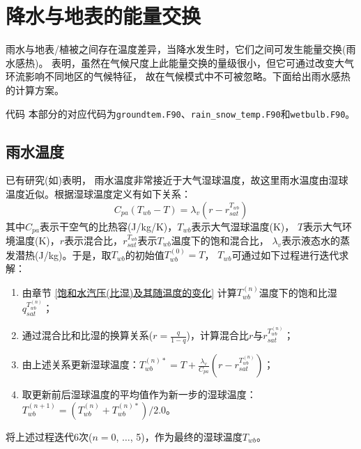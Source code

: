 \chapter{降水与地表的能量交换}

雨水与地表/植被之间存在温度差异，当降水发生时，它们之间可发生能量交换(雨水感热)。
\citet{wei2014impact} 表明，虽然在气候尺度上此能量交换的量级很小，但它可通过改变大气环流影响不同地区的气候特征，
故在气候模式中不可被忽略。下面给出雨水感热的计算方案。
\begin{mymdframed}{代码}
本部分的对应代码为\texttt{groundtem.F90}、\texttt{rain\_snow\_temp.F90}和\texttt{wetbulb.F90}。
\end{mymdframed}


\section{雨水温度}\label{雨水温度}
已有研究(如\citet{anderson1998moored})表明，
雨水温度非常接近于大气湿球温度，故这里雨水温度由湿球温度近似。根据湿球温度定义有如下关系：
\begin{equation}
C_{p a}\left(T_{w b}-T\right)=\lambda_{v}\left(r-r_{s a t}^{T_{w b}}\right)
\end{equation}
其中$C_{pa}$表示干空气的比热容(J/kg/K)，$T_{wb}$表示大气湿球温度(K)，
$T$表示大气环境温度(K)，$r$表示混合比，$r_{sat}^{T_{wb}}$表示$T_{wb}$温度下的饱和混合比，
$\lambda_v$表示液态水的蒸发潜热(J/kg)。于是，取$T_{wb}$的初始值$T_{wb}^{\left(0\right)}=T$，
$T_{wb}$可通过如下过程进行迭代求解：
\begin{enumerate}
    \item 由章节 \ref{饱和水汽压(比湿)及其随温度的变化} 计算$T_{wb}^{\left(n\right)}$温度下的饱和比湿$q_{sat}^{T_{wb}^{\left(n\right)}}$；
    \item 通过混合比和比湿的换算关系($r=\frac{q}{1-q}$)，计算混合比$r$与$r_{sat}^{T_{wb}^{\left(n\right)}}$；
    \item 由上述关系更新湿球温度：$T_{wb}^{\left(n\right)\ast}=T+\frac{\lambda_v}{C_{pa}}\left(r-r_{sat}^{T_{wb}^{\left(n\right)}}\right)$；
    \item 取更新前后湿球温度的平均值作为新一步的湿球温度：$T_{wb}^{\left(n+1\right)}=\left(T_{wb}^{\left(n\right)}+T_{wb}^{\left(n\right)\ast}\right)/2.0$。
\end{enumerate}
将上述过程迭代6次($n=0$, $\ldots$, 5)，作为最终的湿球温度$T_{wb}$。


